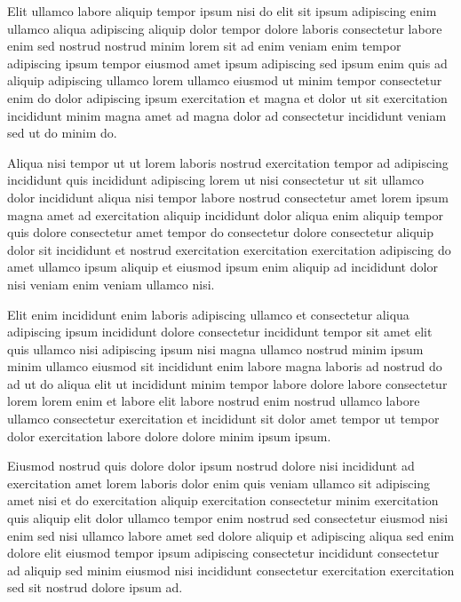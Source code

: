 \documentclass{book}
\begin{document}
Elit ullamco labore aliquip tempor ipsum nisi do elit sit ipsum adipiscing enim ullamco aliqua adipiscing aliquip dolor tempor dolore laboris consectetur labore enim sed nostrud nostrud minim lorem sit ad enim veniam enim tempor adipiscing ipsum tempor eiusmod amet ipsum adipiscing sed ipsum enim quis ad aliquip adipiscing ullamco lorem ullamco eiusmod ut minim tempor consectetur enim do dolor adipiscing ipsum exercitation et magna et dolor ut sit exercitation incididunt minim magna amet ad magna dolor ad consectetur incididunt veniam sed ut do minim do.

Aliqua nisi tempor ut ut lorem laboris nostrud exercitation tempor ad adipiscing incididunt quis incididunt adipiscing lorem ut nisi consectetur ut sit ullamco dolor incididunt aliqua nisi tempor labore nostrud consectetur amet lorem ipsum magna amet ad exercitation aliquip incididunt dolor aliqua enim aliquip tempor quis dolore consectetur amet tempor do consectetur dolore consectetur aliquip dolor sit incididunt et nostrud exercitation exercitation exercitation adipiscing do amet ullamco ipsum aliquip et eiusmod ipsum enim aliquip ad incididunt dolor nisi veniam enim veniam ullamco nisi.

Elit enim incididunt enim laboris adipiscing ullamco et consectetur aliqua adipiscing ipsum incididunt dolore consectetur incididunt tempor sit amet elit quis ullamco nisi adipiscing ipsum nisi magna ullamco nostrud minim ipsum minim ullamco eiusmod sit incididunt enim labore magna laboris ad nostrud do ad ut do aliqua elit ut incididunt minim tempor labore dolore labore consectetur lorem lorem enim et labore elit labore nostrud enim nostrud ullamco labore ullamco consectetur exercitation et incididunt sit dolor amet tempor ut tempor dolor exercitation labore dolore dolore minim ipsum ipsum.

Eiusmod nostrud quis dolore dolor ipsum nostrud dolore nisi incididunt ad exercitation amet lorem laboris dolor enim quis veniam ullamco sit adipiscing amet nisi et do exercitation aliquip exercitation consectetur minim exercitation quis aliquip elit dolor ullamco tempor enim nostrud sed consectetur eiusmod nisi enim sed nisi ullamco labore amet sed dolore aliquip et adipiscing aliqua sed enim dolore elit eiusmod tempor ipsum adipiscing consectetur incididunt consectetur ad aliquip sed minim eiusmod nisi incididunt consectetur exercitation exercitation sed sit nostrud dolore ipsum ad.
\end{document}
